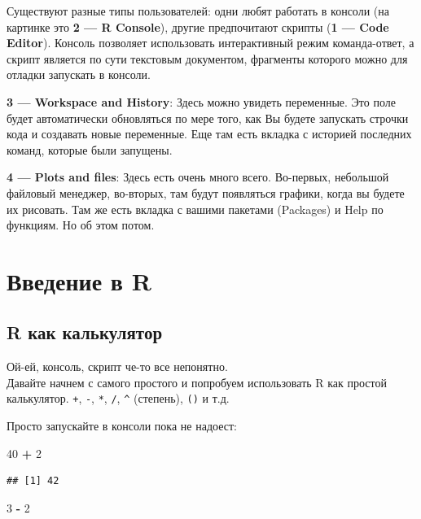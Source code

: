 \documentclass[
]{book}
\newenvironment{Shaded}{\begin{snugshade}}{\end{snugshade}}
\newcommand{\DecValTok}[1]{\textcolor[rgb]{0.00,0.00,0.81}{#1}}
\newcommand{\OperatorTok}[1]{\textcolor[rgb]{0.81,0.36,0.00}{\textbf{#1}}}
\newcommand{\StringTok}[1]{\textcolor[rgb]{0.31,0.60,0.02}{#1}}
\begin{document}
Существуют разные типы пользователей: одни любят работать в консоли (на картинке это \textbf{2 --- R Console}), другие предпочитают скрипты (\textbf{1 --- Code Editor}). Консоль позволяет использовать интерактивный режим команда-ответ, а скрипт является по сути текстовым документом, фрагменты которого можно для отладки запускать в консоли.

\textbf{3 --- Workspace and History}: Здесь можно увидеть переменные. Это поле будет автоматически обновляться по мере того, как Вы будете запускать строчки кода и создавать новые переменные. Еще там есть вкладка с историей последних команд, которые были запущены.

\textbf{4 --- Plots and files}: Здесь есть очень много всего. Во-первых, небольшой файловый менеджер, во-вторых, там будут появляться графики, когда вы будете их рисовать. Там же есть вкладка с вашими пакетами (Packages) и Help по функциям. Но об этом потом.

\hypertarget{ux432ux432ux435ux434ux435ux43dux438ux435-ux432-r}{%
\section{Введение в R}\label{ux432ux432ux435ux434ux435ux43dux438ux435-ux432-r}}

\hypertarget{calc}{%
\subsection{R как калькулятор}\label{calc}}

Ой-ей, консоль, скрипт че-то все непонятно.\\
Давайте начнем с самого простого и попробуем использовать R как простой калькулятор. \texttt{+}, \texttt{-}, \texttt{*}, \texttt{/}, \texttt{\^{}} (степень), \texttt{()} и т.д.

Просто запускайте в консоли пока не надоест:

\begin{Shaded}
\begin{Highlighting}[]
\DecValTok{40} \OperatorTok{+}\StringTok{ }\DecValTok{2}
\end{Highlighting}
\end{Shaded}

\begin{verbatim}
## [1] 42
\end{verbatim}

\begin{Shaded}
\begin{Highlighting}[]
\DecValTok{3} \OperatorTok{-}\StringTok{ }\DecValTok{2}
\end{Highlighting}
\end{Shaded}
\end{document}
